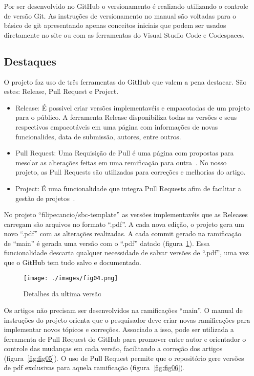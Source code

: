 Por ser desenvolvido no GitHub o versionamento é realizado utilizando o controle de versão Git. As instruções de versionamento no manual são voltadas para o básico de git apresentando apenas conceitos iniciais que podem ser usados diretamente no site ou com as ferramentas do Visual Studio Code e Codespaces.

\subsection{Destaques}
O projeto faz uso de três ferramentas do GitHub que valem a pena destacar. São estes: Release, Pull Request e Project.
\begin{itemize}
	\item Release: É possivel criar versões implementavéis e empacotadas de um projeto para o público. A ferramenta Release disponibiliza todas as versões e seus respectivos empacotáveis em uma página com informações de novas funcionalides, data de submissão, autores, entre outros.~\cite{github:03}
	\item Pull Request: Uma Requisição de Pull é uma página com propostas para mesclar as alterações feitas em uma remificação para outra~\cite{github:04}. No nosso projeto, as Pull Requests são utilizadas para correções e melhorias do artigo.
	\item Project: É uma funcionalidade que integra Pull Requests afim de facilitar a gestão de projetos~\cite{github:05}.
\end{itemize}


No projeto ``filipecancio/sbc-template'' as versões implementavéis que as Releases carregam são arquivos no formato ``.pdf''. A cada nova edição, o projeto gera um novo ``.pdf'' com as alterações realizadas. A cada commit gerado na ramificação de ``main'' é gerada uma versão com o ``.pdf'' datado (figura~\ref{fig:fig04}). Essa funcionalidade descarta qualquer necessidade de salvar versões de ``.pdf'', uma vez que o GitHub tem tudo salvo e documentado.
\begin{figure}[H]
	\centering
	\texttt{[image: ./images/fig04.png]}
	\caption{Detalhes da ultima versão}
	\label{fig:fig04}
\end{figure}

Os artigos não precisam ser desenvolvidos na ramificações ``main''. O manual de instruções do projeto orienta que o pesquisador deve criar novas ramificações para implementar novos tópicos e correções. Associado a isso, pode ser utilizada a ferramenta de Pull Request do GitHub para promover entre autor e orientador o controle das mudanças em cada versão, facilitando a correção dos artigos (figura~\ref{fig:fig05}). O uso de Pull Request permite que o repositório gere versões de pdf exclusivas para aquela ramificação (figura~\ref{fig:fig06}).

